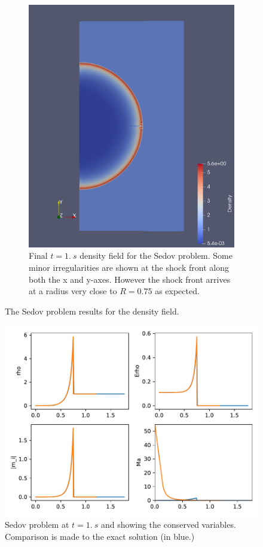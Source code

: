 \begin{figure}[h!]
\begin{subfigure}[h!]{0.9\linewidth}
\centering
\includegraphics[scale=0.25]{figures/sedov-10-den.pdf }
\caption{Final $t = 1. \  s$ density field for the Sedov problem. Some minor irregularities are shown at the shock front along both the x and y-axes. However the shock front arrives at a radius very close to $R = 0.75$ as expected.}
  \label{fig:sedov-10}
\end{subfigure}
\caption{The Sedov problem results for the density field.}
\label{fig:sedov2D}
\end{figure}

\begin{figure}[h!]
 \centering
 \includegraphics[scale=0.8]{figures/sedov-CV.pdf}
 \caption{Sedov problem at $t = 1.\ s$ and showing the conserved variables.  Comparison is made to the exact solution (in blue.) }
 \label{fig:CVsedov}
\end{figure}

